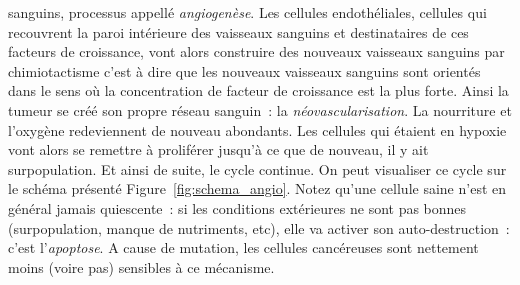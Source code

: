 \documentclass[main.tex]{subfiles}
\begin{document}
\noindent
sanguins, processus appellé \emph{angiogenèse}. 
Les cellules endothéliales, cellules qui recouvrent la paroi intérieure des vaisseaux sanguins et destinataires de ces facteurs de croissance, vont alors construire des nouveaux vaisseaux sanguins par chimiotactisme c'est à dire que les nouveaux vaisseaux sanguins sont orientés dans le sens où la concentration de facteur de croissance est la plus forte. Ainsi la tumeur se créé son propre réseau sanguin~: la \emph{néovascularisation}. La nourriture et l'oxygène redeviennent de nouveau abondants. 
Les cellules qui étaient en hypoxie vont alors se remettre à proliférer jusqu'à ce que de nouveau, il y ait surpopulation. Et ainsi de suite, le cycle continue. On peut visualiser ce cycle sur le schéma présenté Figure~\ref{fig:schema_angio}. Notez qu'une cellule saine n'est en général jamais quiescente~: si les conditions extérieures ne sont pas bonnes (surpopulation, manque de nutriments, etc), elle va activer son auto-destruction~: c'est l'\emph{apoptose}. A cause de mutation, les cellules cancéreuses sont nettement moins (voire pas) sensibles à ce mécanisme. 
\end{document}
